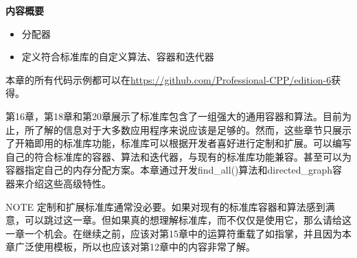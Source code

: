 \noindent
\textbf{内容概要}

\begin{itemize}
\item
分配器

\item
定义符合标准库的自定义算法、容器和迭代器
\end{itemize}

本章的所有代码示例都可以在\url{https://github.com/Professional-CPP/edition-6}获得。

第16章，第18章和第20章展示了标准库包含了一组强大的通用容器和算法。目前为止，所了解的信息对于大多数应用程序来说应该是足够的。然而，这些章节只展示了开箱即用的标准库功能，标准库可以根据开发者喜好进行定制和扩展。可以编写自己的符合标准库的容器、算法和迭代器，与现有的标准库功能兼容。甚至可以为容器指定自己的内存分配方案。本章通过开发find\_all()算法和directed\_graph容器来介绍这些高级特性。

\begin{myNotic}{NOTE}
定制和扩展标准库通常没必要。如果对现有的标准库容器和算法感到满意，可以跳过这一章。但如果真的想理解标准库，而不仅仅是使用它，那么请给这一章一个机会。在继续之前，应该对第15章中的运算符重载了如指掌，并且因为本章广泛使用模板，所以也应该对第12章中的内容非常了解。
\end{myNotic}


